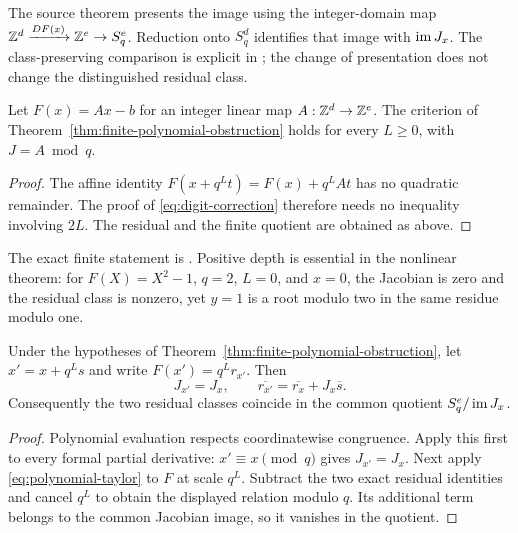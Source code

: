 The source theorem
presents the image using the integer-domain map
$\mathbb Z^d\xrightarrow{DF(x)}\mathbb Z^e\to S_q^e$. Reduction onto $S_q^d$ identifies
that image with $\operatorname{im} J_x$. The class-preserving comparison is explicit in
; the change of
presentation does not change the distinguished residual class.

\begin{proposition}\label{prop:affine-obstruction}
Let $F(x)=Ax-b$ for an integer linear map $A:\mathbb Z^d\to\mathbb Z^e$. The criterion
of Theorem~\ref{thm:finite-polynomial-obstruction} holds for every $L\ge0$,
with $J=A\bmod q$.
\end{proposition}

\begin{proof}
The affine identity
$F(x+q^Lt)=F(x)+q^LAt$ has no quadratic remainder. The proof of
\eqref{eq:digit-correction} therefore needs no inequality involving $2L$.
The residual and the finite quotient are obtained as above.
\end{proof}

The exact finite statement is
.
Positive depth is essential in the nonlinear theorem: for $F(X)=X^2-1$,
$q=2$, $L=0$, and $x=0$, the Jacobian is zero and the residual class is
nonzero, yet $y=1$ is a root modulo two in the same residue modulo one.

\begin{proposition}
\label{prop:representative-independence}
Under the hypotheses of Theorem~\ref{thm:finite-polynomial-obstruction},
let $x'=x+q^Ls$ and write $F(x')=q^Lr_{x'}$. Then
\[
 J_{x'}=J_x,\qquad
 \overline{r_{x'}}=\overline{r_x}+J_x\overline s.
\]
Consequently the two residual classes coincide in the common quotient
$S_q^e/\operatorname{im} J_x$.
\end{proposition}

\begin{proof}
Polynomial evaluation respects coordinatewise congruence. Apply this first
to every formal partial derivative: $x'\equiv x\pmod q$ gives
$J_{x'}=J_x$. Next apply \eqref{eq:polynomial-taylor} to $F$ at scale $q^L$.
Subtract the two exact residual identities and cancel $q^L$ to obtain the
displayed relation modulo $q$. Its additional term belongs to the common
Jacobian image, so it vanishes in the quotient.
\end{proof}

